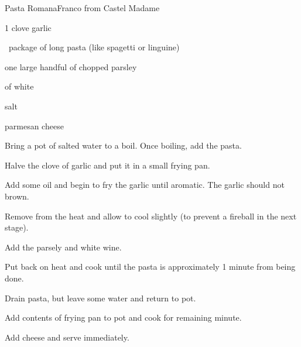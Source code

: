 \begin{recipe}{Pasta Romana}{Franco from Castel Madame}{}

\begin{ingredients}
\item 1 clove garlic
\item \half{}~package of long pasta (like spagetti or linguine)
\item one large handful of chopped parsley
\item \C{\half} of white 
\item {}
\item salt
\item parmesan cheese
\end{ingredients}

\begin{directions}
\item Bring a pot of salted water to a boil. Once boiling, add the pasta.
\item Halve the clove of garlic and put it in a small frying pan.
\item Add some oil and begin to fry the garlic until aromatic. The garlic should not brown.
\item Remove from the heat and allow to cool slightly (to prevent a fireball in the next stage).
\item Add the parsely and white wine.
\item Put back on heat and cook until the pasta is approximately 1 minute from being done.
\item Drain pasta, but leave some water and return to pot.
\item Add contents of frying pan to pot and cook for remaining minute.
\item Add cheese and serve immediately.
\end{directions}

\end{recipe}
